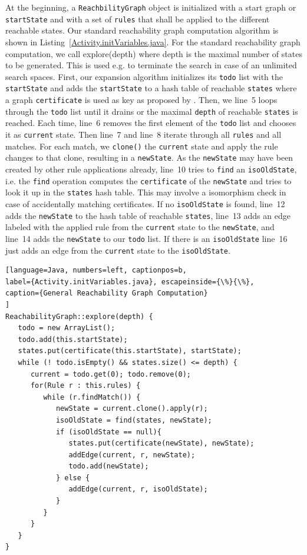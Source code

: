 \documentclass[submission,copyright,creativecommons]{eptcs}
\begin{document}
At the beginning, a \texttt{ReachbilityGraph} object is initialized with a 
start graph or \texttt{startState} and with a set of \texttt{rules} that 
shall be applied to the different reachable states. Our standard 
reachability graph computation algorithm is shown in 
Listing~\ref{Activity.initVariables.java}. For the standard reachability graph 
computation, we call explore(depth) where depth is the maximal number of 
states to be generated. This is used e.g. to terminate the search in case of 
an unlimited search spaces. First, our expansion algorithm initializes 
its \texttt{todo} list with the \texttt{startState} and adds the 
\texttt{startState} to a hash table of reachable \texttt{states} where 
a graph \texttt{certificate} is used as key as proposed by \cite{rensink2003groove}.
Then, we line~5 loops through the \texttt{todo} list until it drains or the maximal 
\texttt{depth} of reachable \texttt{states} is reached. Each time, line~6 removes 
the first element of the \texttt{todo} list and chooses it as \texttt{current} state. 
Then line~7 and line~8 iterate through all \texttt{rules} and all matches. 
For each match, we \texttt{clone()} the \texttt{current} state and apply the 
rule changes to that clone, resulting in a \texttt{newState}. As the \texttt{newState}
may have been created by other rule applications already, line~10 tries to \texttt{find} 
an \texttt{isoOldState}, i.e. the \texttt{find}  operation computes the 
\texttt{certificate} of the \texttt{newState} and tries to look it up in the 
\texttt{states} hash table. This may involve a isomorphism check in case of accidentally 
matching certificates. If no \texttt{isoOldState} is found, line~12 adds the 
\texttt{newState} to the hash table of reachable \texttt{states}, line~13 adds an edge
labeled with the applied rule from the \texttt{current} state to the \texttt{newState}, 
and line~14 adds the \texttt{newState} to our \texttt{todo} list. If there is an 
\texttt{isoOldState} line~16 just adds an edge from the \texttt{current} state to the 
\texttt{isoOldState}.

\begin{lstlisting}[language=Java, numbers=left, captionpos=b, 
label={Activity.initVariables.java}, escapeinside={\%}{\%},
caption={General Reachability Graph Computation}
]
ReachabilityGraph::explore(depth) {
   todo = new ArrayList();
   todo.add(this.startState);
   states.put(certificate(this.startState), startState);
   while (! todo.isEmpty() && states.size() <= depth) {
      current = todo.get(0); todo.remove(0);
      for(Rule r : this.rules) {
         while (r.findMatch()) {
            newState = current.clone().apply(r);
            isoOldState = find(states, newState);
            if (isoOldState == null){
               states.put(certificate(newState), newState);
               addEdge(current, r, newState);
               todo.add(newState);
            } else {
               addEdge(current, r, isoOldState);
            }
         }
      }
   }
}
\end{lstlisting}
\end{document}

